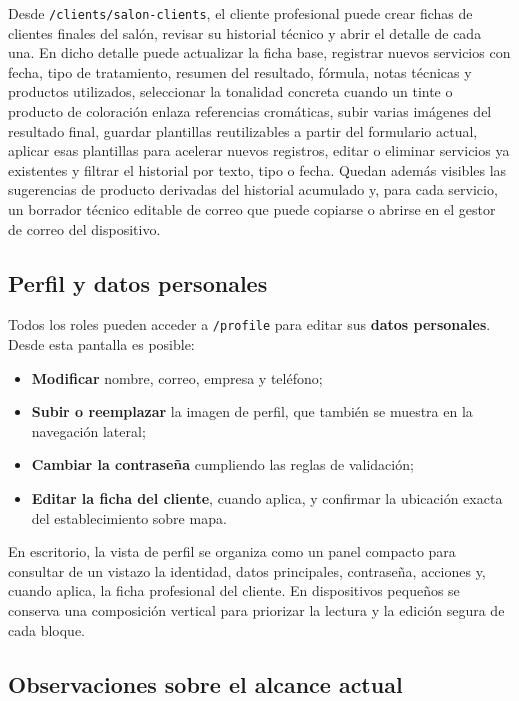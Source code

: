 Desde \texttt{/clients/salon-clients}, el cliente profesional puede crear fichas de clientes finales del salón, revisar su historial técnico y abrir el detalle de cada una. En dicho detalle puede actualizar la ficha base, registrar nuevos servicios con fecha, tipo de tratamiento, resumen del resultado, fórmula, notas técnicas y productos utilizados, seleccionar la tonalidad concreta cuando un tinte o producto de coloración enlaza referencias cromáticas, subir varias imágenes del resultado final, guardar plantillas reutilizables a partir del formulario actual, aplicar esas plantillas para acelerar nuevos registros, editar o eliminar servicios ya existentes y filtrar el historial por texto, tipo o fecha. Quedan además visibles las sugerencias de producto derivadas del historial acumulado y, para cada servicio, un borrador técnico editable de correo que puede copiarse o abrirse en el gestor de correo del dispositivo.

\subsection{Perfil y datos personales}

Todos los roles pueden acceder a \texttt{/profile} para editar sus \textbf{datos personales}. Desde esta pantalla es posible:

\begin{itemize}
    \item \textbf{Modificar} nombre, correo, empresa y teléfono;
    \item \textbf{Subir o reemplazar} la imagen de perfil, que también se muestra en la navegación lateral;
    \item \textbf{Cambiar la contraseña} cumpliendo las reglas de validación;
    \item \textbf{Editar la ficha del cliente}, cuando aplica, y confirmar la ubicación exacta del establecimiento sobre mapa.
\end{itemize}

En escritorio, la vista de perfil se organiza como un panel compacto para consultar de un vistazo la identidad, datos principales, contraseña, acciones y, cuando aplica, la ficha profesional del cliente. En dispositivos pequeños se conserva una composición vertical para priorizar la lectura y la edición segura de cada bloque.

\subsection{Observaciones sobre el alcance actual}

